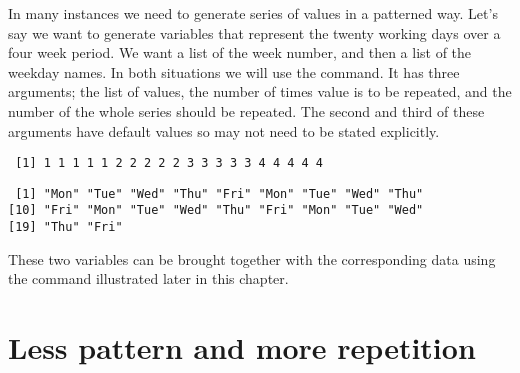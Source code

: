 In many instances we need to generate series of values in a patterned way. Let's say we want to generate variables that represent the twenty working days over a four week period. We want a list of the week number, and then a list of the weekday names. In both situations we will use the  command. It has three arguments; the list of values, the number of times  value is to be repeated, and the number of  the whole series should be repeated.  
The second and third of these arguments have default values so may not need to be stated explicitly. 
\begin{knitrout}
\color{fgcolor}\begin{kframe}
\begin{alltt}
\hlstd{> } \hlkwb{=} \hlstd{(}\hlopt{:}\hlstd{,} \hlstd{=}\hlstd{)}
\hlstd{> }
\end{alltt}
\begin{verbatim}
 [1] 1 1 1 1 1 2 2 2 2 2 3 3 3 3 3 4 4 4 4 4
\end{verbatim}
\begin{alltt}
\hlstd{> } \hlkwb{=} \hlstd{(}\hlstd{(}\hlstd{,} \hlstd{,} \hlstd{,} \hlstd{,} \hlstd{),} \hlstd{=}\hlstd{)}
\hlstd{> }
\end{alltt}
\begin{verbatim}
 [1] "Mon" "Tue" "Wed" "Thu" "Fri" "Mon" "Tue" "Wed" "Thu"
[10] "Fri" "Mon" "Tue" "Wed" "Thu" "Fri" "Mon" "Tue" "Wed"
[19] "Thu" "Fri"
\end{verbatim}
\end{kframe}
\end{knitrout}
These two variables can be brought together with the corresponding data using the  command illustrated later in this chapter. 
 
\section{Less pattern and more repetition} 
 

